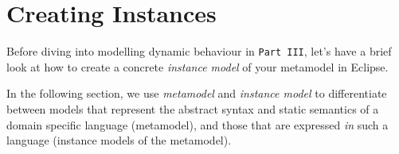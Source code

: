 \newpage
\genHeader

\section{Creating Instances}

\hypertarget{creatingInstance common}{}Before diving into modelling dynamic behaviour in \texttt{Part III}, let's have a brief look at how to create a concrete \emph{instance model} of your metamodel in Eclipse.

In the following section, we use \emph{metamodel} and \emph{instance model} to differentiate between models that represent the abstract syntax and static semantics of a domain specific language (metamodel), and those that are expressed \emph{in} such a language (instance models of the metamodel).

